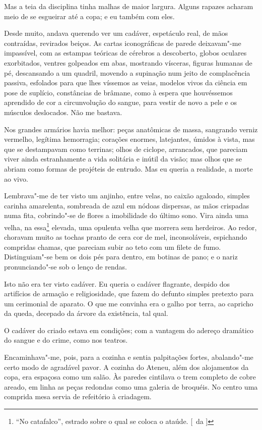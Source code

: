Mas a teia da disciplina tinha malhas de maior largura. Alguns
rapazes acharam meio de se esgueirar até a copa; e eu também com eles.

Desde muito, andava querendo ver um cadáver, espetáculo real, de mãos
contraídas, revirados beiços. As cartas iconográficas de parede
deixavam"-me impassível, com as estampas teóricas de cérebros a
descoberto, globos oculares exorbitados, ventres golpeados em abas,
mostrando vísceras, figuras humanas de pé, descansando a um quadril,
movendo a supinação num jeito de complacência passiva, esfolados para
que lhes víssemos as veias, modelos vivos da ciência em pose de
suplício, constâncias de brâmane, como à espera que houvéssemos
aprendido de cor a circunvolução do sangue, para vestir de novo a pele
e os músculos deslocados. Não me bastava. 

Nos grandes armários havia
melhor: peças anatômicas de massa, sangrando verniz vermelho, legítima
hemorragia; corações enormes, latejantes, úmidos à vista, mas que se
destampavam como terrinas; olhos de ciclope, arrancados, que pareciam
viver ainda estranhamente a vida solitária e inútil da visão; mas olhos
que se abriam como formas de projéteis de entrudo. Mas eu queria a
realidade, a morte ao vivo. 

Lembrava"-me de ter visto um anjinho,
entre velas, no caixão agaloado, simples carinha amarelenta, sombreada
de azul em nódoas dispersas, as mãos crispadas numa fita, cobrindo"-se
de flores a imobilidade do último sono. Vira ainda uma velha, na essa\footnote{ ``No catafalco'', 
estrado sobre o qual se coloca o ataúde. [~da ]} elevada, uma opulenta 
velha que morrera sem herdeiros. Ao redor,
choravam muito as tochas pranto de cera cor de mel, inconsoláveis,
espichando compridas chamas, que pareciam subir ao teto com um filete
de fumo. Distinguiam"-se bem os dois pés para dentro, em botinas de
pano; e o nariz pronunciando"-se sob o lenço de rendas. 


Isto não era
ter visto cadáver. Eu queria o cadáver flagrante, despido dos
artifícios de armação e religiosidade, que fazem do defunto simples
pretexto para um cerimonial de aparato. O que me convinha era o galho
por terra, ao capricho da queda, decepado da árvore da existência, tal
qual. 

O cadáver do criado estava em condições; com a vantagem do
adereço dramático do sangue e do crime, como nos teatros.

Encaminhava"-me, pois, para a cozinha e sentia palpitações fortes,
abalando"-me certo modo de agradável pavor. A cozinha do Ateneu, além
dos alojamentos da copa, era espaçosa como um salão. Às paredes
cintilava o trem completo de cobre areado, em linha as peças redondas
como uma galeria de broquéis. No centro uma comprida mesa servia de
refeitório à criadagem. 

